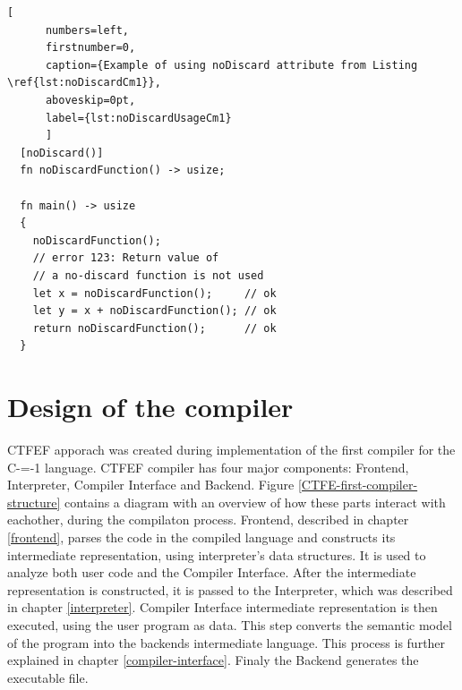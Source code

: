 \begin{minipage}{\linewidth}

	\begin{lstlisting}[
	  numbers=left,
	  firstnumber=0,
	  caption={Example of using noDiscard attribute from Listing \ref{lst:noDiscardCm1}},
	  aboveskip=0pt,
	  label={lst:noDiscardUsageCm1}
	  ]
  [noDiscard()]
  fn noDiscardFunction() -> usize;

  fn main() -> usize
  {
	noDiscardFunction();
	// error 123: Return value of
	// a no-discard function is not used
	let x = noDiscardFunction();     // ok
	let y = x + noDiscardFunction(); // ok
	return noDiscardFunction();      // ok
  }
  \end{lstlisting}
\end{minipage}

\section{Design of the compiler}
\label{compiler-design}

CTFEF apporach was created during implementation of the first compiler for the C-=-1 language\cite{grabski2022compilation}.
CTFEF compiler has four major components: Frontend, Interpreter, Compiler Interface and Backend.
Figure \ref{CTFE-first-compiler-structure} contains a diagram with an overview of how these parts interact with eachother, during the compilaton process.
Frontend, described in chapter \ref{frontend}, parses the code in the compiled language and constructs its intermediate representation, using interpreter's data structures.
It is used to analyze both user code and the Compiler Interface.
After the intermediate representation is constructed, it is passed to the Interpreter, which was described in chapter \ref{interpreter}.
Compiler Interface intermediate representation is then executed, using the user program as data.
This step converts the semantic model of the program into the backends intermediate language.
This process is further explained in chapter \ref{compiler-interface}.
Finaly the Backend generates the executable file.

